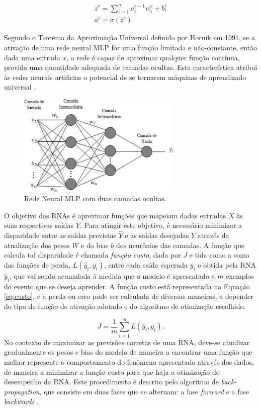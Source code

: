 \begin{gather}\label{eq:funcao_neuronio_camadas}
	z^c = \sum_{i=1}^n a_i^{c-1} w_i^c + b_i^c\\
	a^c = \sigma(z^c)
\end{gather}

Segundo o Teorema da Aproximação Universal definido por Hornik em 1991, se a ativação de uma rede neural MLP for uma função limitada e não-constante, então dada uma entrada $x$, a rede é capaz de aproximar qualquer função contínua, provida uma quantidade adequada de camadas ocultas. Esta característica atribui às redes neurais artificias o potencial de se tornarem máquinas de aprendizado universal \cite{hornik1991approximation}.

\begin{figure}[ht]
	\centering
	\caption{Rede Neural MLP com duas camadas ocultas.}
	\label{fig:mlp}
	\includegraphics[width=0.7\textwidth]{img/mlprna.jpg}
\end{figure}

O objetivo das RNAs é aproximar funções que mapeiam dadas entradas $X$ às suas respectivas saídas $Y$. Para atingir este objetivo, é necessário minimizar a disparidade entre as saídas previstas $\hat{Y}$ e as saídas desejadas $Y$ através da atualização dos pesos $W$ e do bias $b$ dos neurônios das camadas. A função que calcula tal disparidade é chamada \emph{função custo}, dada por $J$ e tida como a soma das funções de perda, $L(\hat{y}_i, y_i)$, entre cada saída esperada $y_i$ e obtida pela RNA $\hat{y}_i$, que vai sendo acumulada à medida que o modelo é apresentado a $m$ exemplos do evento que se deseja aprender. A função custo está representada na Equação \ref{eq:custo}, e a perda ou erro pode ser calculada de diversas maneiras, a depender do tipo de função de ativação adotado e do algoritmo de otimização escolhido.


\begin{equation}\label{eq:custo}
J = \frac{1}{m} \sum_{i=1}^{m} L(\hat{y}_{i}, y_{i}).
\end{equation} No contexto de maximizar as previsões corretas de uma RNA, deve-se atualizar gradualmente os pesos e bias do modelo de maneira a encontrar uma função que melhor represente o comportamento do fenômeno apresentado através dos dados, de maneira a minimizar a função custo para que haja a otimização do desempenho da RNA. Este procedimento é descrito pelo algoritmo de \emph{back-propagation}, que consiste em duas fases que se alternam: a fase \emph{forward} e a fase \emph{backwards} \cite{haykin2009neural}.

